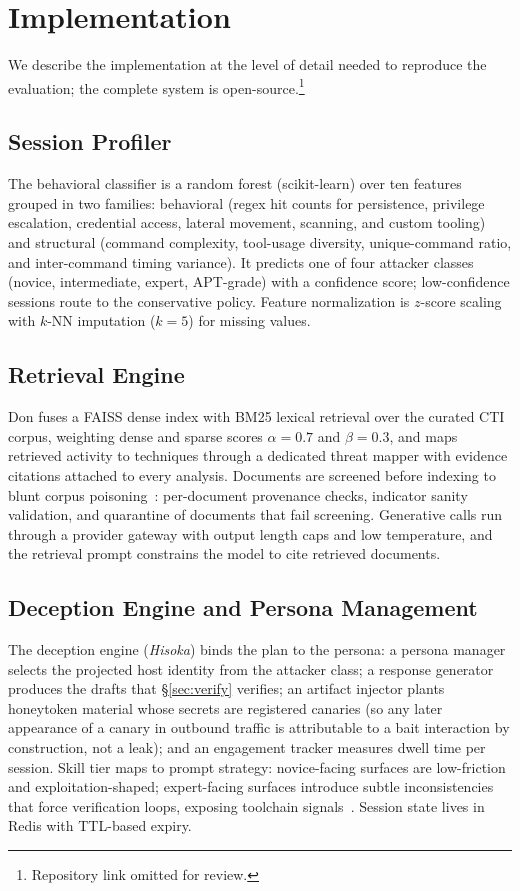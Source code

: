 \section{Implementation}
\label{sec:implementation}

We describe the implementation at the level of detail needed to reproduce
the evaluation; the complete system is open-source.\footnote{Repository
link omitted for review.}

\subsection{Session Profiler}
The behavioral classifier is a random forest (scikit-learn) over ten
features grouped in two families: behavioral (regex hit counts for
persistence, privilege escalation, credential access, lateral movement,
scanning, and custom tooling) and structural (command complexity,
tool-usage diversity, unique-command ratio, and inter-command timing
variance). It predicts one of four attacker classes (novice, intermediate,
expert, APT-grade) with a confidence score; low-confidence sessions route
to the conservative policy. Feature normalization is $z$-score scaling
with $k$-NN imputation ($k{=}5$) for missing values.

\subsection{Retrieval Engine}
Don fuses a FAISS dense index with BM25 lexical retrieval over the curated
CTI corpus, weighting dense and sparse scores $\alpha{=}0.7$ and
$\beta{=}0.3$, and maps retrieved activity to \attck techniques through a
dedicated threat mapper with evidence citations attached to every
analysis. Documents are screened before indexing to blunt corpus
poisoning~\cite{chaudhari2024,jia2025}: per-document provenance checks,
indicator sanity validation, and quarantine of documents that fail
screening. Generative calls run through a provider gateway with output
length caps and low temperature, and the retrieval prompt constrains the
model to cite retrieved documents.

\subsection{Deception Engine and Persona Management}
The deception engine (\emph{Hisoka}) binds the plan to the persona: a
persona manager selects the projected host identity from the attacker
class; a response generator produces the drafts that \S\ref{sec:verify}
verifies; an artifact injector plants honeytoken
material whose secrets are registered canaries (so any later
appearance of a canary in outbound traffic is attributable to a bait
interaction by construction, not a leak); and an engagement tracker measures dwell time per session. Skill tier maps to
prompt strategy: novice-facing surfaces are low-friction and
exploitation-shaped; expert-facing surfaces introduce subtle
inconsistencies that force verification loops, exposing toolchain
signals~\cite{kouremetis2024}. Session state lives in Redis with
TTL-based expiry.


